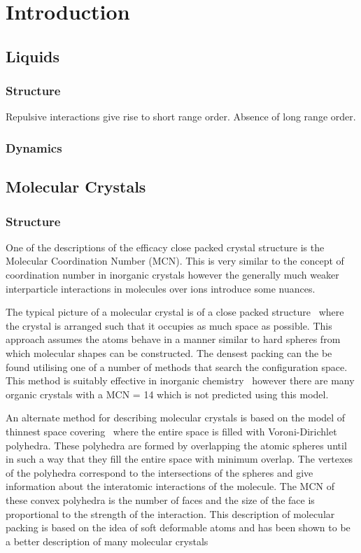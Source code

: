 
\chapter{Introduction}

\section{Liquids}
\subsection{Structure}
Repulsive interactions give rise to short range order. Absence of long range order.
\subsection{Dynamics}


\section{Molecular Crystals}
\subsection{Structure}

One of the descriptions of the efficacy close packed crystal structure is the Molecular Coordination Number (MCN). This is very similar to the concept of coordination number in inorganic crystals however the generally much weaker interparticle interactions in molecules over ions introduce some nuances.

The typical picture of a molecular crystal is of a close packed structure~\cite{kitaigorodskii:73} where the crystal is arranged such that it occupies as much space as possible. This approach assumes the atoms behave in a manner similar to hard spheres from which molecular shapes can be constructed. The densest packing can the be found utilising one of a number of methods that search the configuration space. This method is suitably effective in inorganic chemistry~\cite{wells:73} however there are many organic crystals with a MCN = 14 which is not predicted using this model.

An alternate method for describing molecular crystals is based on the model of thinnest space covering~\cite{blatov:95} where the entire space is filled with Voroni-Dirichlet polyhedra. These polyhedra are formed by overlapping the atomic spheres until in such a way that they fill the entire space with minimum overlap. The vertexes of the polyhedra correspond to the intersections of the spheres and give information about the interatomic interactions of the molecule. The MCN of these convex polyhedra is the number of faces and the size of the face is proportional to the strength of the interaction. This description of molecular packing is based on the idea of soft deformable atoms and has been shown to be a better description of many molecular crystals~\cite{blatov:97,peresypkina:99,peresypkina:00}

